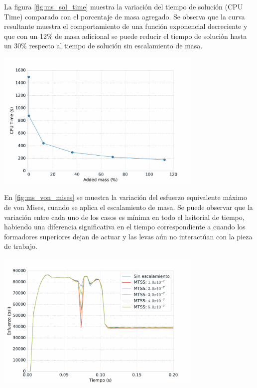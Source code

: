 La figura \ref{fig:ms_sol_time} muestra la variación del tiempo de solución (CPU Time) comparado con 
el porcentaje de masa agregado. Se observa que la curva resultante muestra el comportamiento de 
una función exponencial decreciente y que con un 12\% de masa adicional se puede reducir el tiempo 
de solución hasta un 30\% respecto al tiempo de solución sin escalamiento de masa.

\begin{center}
\includegraphics[width=0.75\textwidth]{src/ch4/ms_sol_time.pdf}
\label{fig:ms_sol_time}
\end{center}

En \ref{fig:ms_von_mises} se muestra la variación del esfuerzo equivalente máximo de von Mises, cuando 
se aplica el escalamiento de masa. Se puede observar que la variación entre cada uno de los casos 
es mínima en todo el hsitorial de tiempo, habiendo una diferencia significativa en el tiempo 
correspondiente a cuando los formadores superiores dejan de actuar y las levas aún no interactúan 
con la pieza de trabajo.

\begin{center}
\includegraphics[width=0.75\textwidth]{src/ch4/ms_von_mises.pdf}
\label{fig:ms_von_mises}
\end{center}

